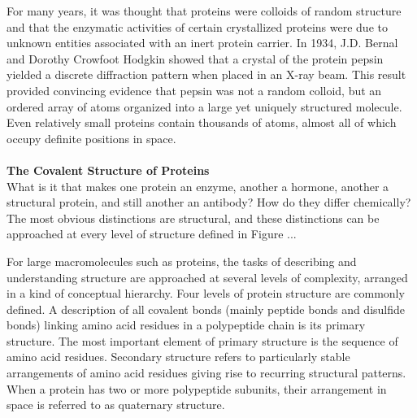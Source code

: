 For many years, it was thought that proteins were colloids of random structure and that the enzymatic activities of certain crystallized proteins were due to unknown entities associated with an inert protein carrier. In 1934, J.D. Bernal and Dorothy Crowfoot Hodgkin showed that a crystal of the protein pepsin yielded a discrete diffraction pattern when placed in an X-ray beam. This result provided convincing evidence that pepsin was not a random colloid, but an ordered array of atoms organized into a large yet uniquely structured molecule. Even relatively small proteins contain thousands of atoms, almost all of which occupy definite positions in space. \cite{voet2016fundamentals}\\
\\
\textbf{The Covalent Structure of Proteins}\\
What is it that makes one protein an enzyme, another a hormone, another a structural protein, and still another an antibody? How do they differ chemically? The most obvious distinctions are structural, and these distinctions can be approached at every level of structure defined in Figure ... 

For large macromolecules such as proteins, the tasks of describing and understanding structure are approached at several levels of complexity, arranged in a kind of conceptual hierarchy. 
Four levels of protein structure are commonly defined. A description of all covalent bonds (mainly peptide bonds and disulfide bonds) linking amino acid residues in a polypeptide chain is its primary structure. The most important element of primary structure is the sequence of amino acid residues. Secondary structure refers to particularly stable arrangements of amino acid residues giving rise to recurring structural patterns. 
When a protein has two or more polypeptide subunits, their arrangement in space is referred to as quaternary structure.

